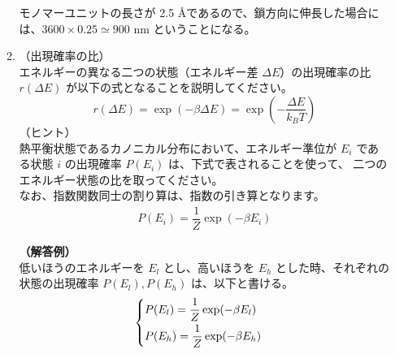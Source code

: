 \documentclass[11pt]{jsarticle}
\begin{document}
\begin{itemize}
\begin{enumerate}
		モノマーユニットの長さが 2.5 \AA であるので、鎖方向に伸長した場合には、$3600 \times 0.25 \simeq 900$ nm ということになる。

		\item
		（出現確率の比）\\
		エネルギーの異なる二つの状態（エネルギー差 $\Delta E$）の出現確率の比 $r(\Delta E)$ が以下の式となることを説明してください。
		\begin{equation*}
		r(\Delta E) = \exp(-\beta \Delta E)=\exp \left( -\dfrac{\Delta E}{k_B T} \right)
		\end{equation*}
		（ヒント）\\
		熱平衡状態であるカノニカル分布において、エネルギー準位が $E_i$ である状態 $i$ の出現確率 $P(E_i)$ は、下式で表されることを使って、
		二つのエネルギー状態の比を取ってください。\\
		なお、指数関数同士の割り算は、指数の引き算となります。
		\begin{align*}
		P(E_i) = \dfrac{1}{Z} \exp(-\beta E_i)
		\end{align*}

		{\bf（解答例）}\\
		低いほうのエネルギーを $E_l$ とし、高いほうを $E_h$ とした時、それぞれの状態の出現確率 $P(E_l), P(E_h)$ は、以下と書ける。
		\begin{align*}
			\begin{cases}
			P(E_l) = \dfrac{1}{Z} \exp(-\beta E_l) \notag \\[6pt]
			P(E_h) = \dfrac{1}{Z} \exp(-\beta E_h)
			\end{cases}
		\end{align*}


\end{enumerate}
\end{itemize}
\end{document}
